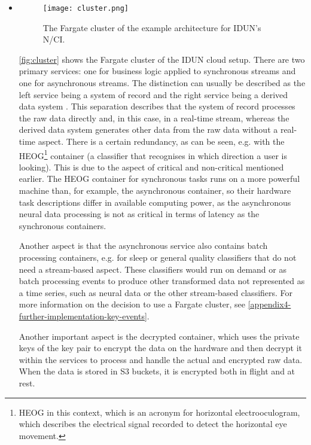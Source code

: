 \begin{itemize}

  \item \begin{figure}[!ht]
          \centering
          \texttt{[image: cluster.png]}
          \caption{The Fargate cluster of the example architecture for IDUN's N/CI.}
          \label{fig:cluster}
        \end{figure}

        \autoref{fig:cluster} shows the Fargate cluster of the IDUN cloud setup. There are two primary services: one for business logic applied to synchronous streams and one for asynchronous streams. The distinction can usually be described as the left service being a system of record and the right service being a derived data system \citep{kleppmann_designing_2017}. This separation describes that the system of record processes the raw data directly and, in this case, in a real-time stream, whereas the derived data system generates other data from the raw data without a real-time aspect. There is a certain redundancy, as can be seen, e.g. with the HEOG\footnote{HEOG in this context, which is an acronym for horizontal electrooculogram, which describes the electrical signal recorded to detect the horizontal eye movement.} container (a classifier that recognises in which direction a user is looking). This is due to the aspect of critical and non-critical mentioned earlier. The HEOG container for synchronous tasks runs on a more powerful machine than, for example, the asynchronous container, so their hardware task descriptions differ in available computing power, as the asynchronous neural data processing is not as critical in terms of latency as the synchronous containers.

        Another aspect is that the asynchronous service also contains batch processing containers, e.g. for sleep or general quality classifiers that do not need a stream-based aspect. These classifiers would run on demand or as batch processing events to produce other transformed data not represented as a time series, such as neural data or the other stream-based classifiers. For more information on the decision to use a Fargate cluster, see \autoref{appendix4-further-implementation-key-events}.

        Another important aspect is the decrypted container, which uses the private keys of the key pair to encrypt the data on the hardware and then decrypt it within the services to process and handle the actual and encrypted raw data. When the data is stored in S3 buckets, it is encrypted both in flight and at rest.


\end{itemize}
